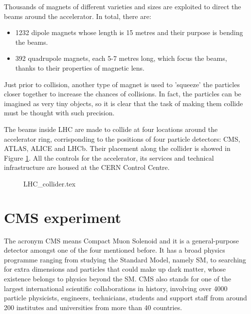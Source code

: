 Thousands of magnets of different varieties and sizes are exploited to direct the beams around the accelerator. In total, there are\footnotemark:
\begin{itemize}
	\item 1232 dipole magnets whose length is 15 metres and their purpose is bending the beams.
	\item 392 quadrupole magnets, each 5-7 metres long, which focus the beams, thanks to their properties of magnetic lens.
\end{itemize}
Just prior to collision, another type of magnet is used to 'squeeze' the particles closer together to increase the chances of collisions. In fact, the particles can be imagined as very tiny objects, so it is clear that the task of making them collide must be thought with such precision.

The beams inside LHC are made to collide at four locations around the accelerator ring, corrisponding to the positions of four particle detectors: CMS, ATLAS, ALICE and LHCb. Their placement along the collider is showed in Figure \ref{fig:LHC_COLLIDER}. All the controls for the accelerator, its services and technical infrastructure are housed at the CERN Control Centre.

\begin{figure}[t]
	\centering
	{LHC_collider.tex}
	\label{fig:LHC_COLLIDER}
\end{figure}





\section{CMS experiment}
The acronym CMS means Compact Muon Solenoid and it is a general-purpose detector amongst one of the four mentioned before. It has a broad physics programme ranging from studying the Standard Model, namely SM, to searching for extra dimensions and particles that could make up dark matter, whose existence belongs to physics beyond the SM. CMS also stands for one of the largest international scientific collaborations in history, involving over 4000 particle physicists, engineers, technicians, students and support staff from around 200 institutes and universities from more than 40 countries.

